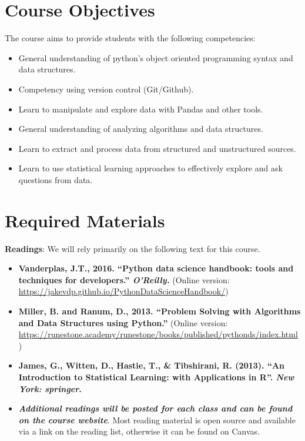 \documentclass[
  12pt,
]{article}
\begin{document}
\hypertarget{course-objectives}{%
\section{Course Objectives}\label{course-objectives}}

The course aims to provide students with the following competencies:

\begin{itemize}
\item
  General understanding of python's object oriented programming syntax
  and data structures.
\item
  Competency using version control (Git/Github).
\item
  Learn to manipulate and explore data with Pandas and other tools.
\item
  General understanding of analyzing algorithms and data structures.
\item
  Learn to extract and process data from structured and unstructured
  sources.
\item
  Learn to use statistical learning approaches to effectively explore
  and ask questions from data.
\end{itemize}

\hypertarget{required-materials}{%
\section{Required Materials}\label{required-materials}}

\textbf{Readings}: We will rely primarily on the following text for this
course.

\begin{itemize}
\item
  \textbf{Vanderplas, J.T., 2016. ``Python data science handbook: tools
  and techniques for developers.'' \emph{O'Reilly.}} (Online version:
  \url{https://jakevdp.github.io/PythonDataScienceHandbook/})
\item
  \textbf{Miller, B. and Ranum, D., 2013. ``Problem Solving with
  Algorithms and Data Structures using Python.''} (Online version:
  \url{https://runestone.academy/runestone/books/published/pythonds/index.html})
\item
  \textbf{James, G., Witten, D., Hastie, T., \& Tibshirani, R. (2013).
  ``An Introduction to Statistical Learning: with Applications in R''.
  \emph{New York: springer}.}
\item
  \textbf{\emph{Additional readings will be posted for each class and
  can be found on the course website}}. Most reading material is open
  source and available via a link on the reading list, otherwise it can
  be found on Canvas.
\end{itemize}
\end{document}
